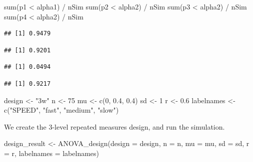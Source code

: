 \documentclass[
]{book}
\newenvironment{Shaded}{\begin{snugshade}}{\end{snugshade}}
\newcommand{\AttributeTok}[1]{\textcolor[rgb]{0.77,0.63,0.00}{#1}}
\newcommand{\DecValTok}[1]{\textcolor[rgb]{0.00,0.00,0.81}{#1}}
\newcommand{\FloatTok}[1]{\textcolor[rgb]{0.00,0.00,0.81}{#1}}
\newcommand{\FunctionTok}[1]{\textcolor[rgb]{0.00,0.00,0.00}{#1}}
\newcommand{\NormalTok}[1]{#1}
\newcommand{\OtherTok}[1]{\textcolor[rgb]{0.56,0.35,0.01}{#1}}
\newcommand{\SpecialCharTok}[1]{\textcolor[rgb]{0.00,0.00,0.00}{#1}}
\newcommand{\StringTok}[1]{\textcolor[rgb]{0.31,0.60,0.02}{#1}}
\begin{document}
\begin{Shaded}
\begin{Highlighting}[]
\FunctionTok{sum}\NormalTok{(p1 }\SpecialCharTok{\textless{}}\NormalTok{ alpha1) }\SpecialCharTok{/}\NormalTok{ nSim}
\FunctionTok{sum}\NormalTok{(p2 }\SpecialCharTok{\textless{}}\NormalTok{ alpha2) }\SpecialCharTok{/}\NormalTok{ nSim}
\FunctionTok{sum}\NormalTok{(p3 }\SpecialCharTok{\textless{}}\NormalTok{ alpha2) }\SpecialCharTok{/}\NormalTok{ nSim}
\FunctionTok{sum}\NormalTok{(p4 }\SpecialCharTok{\textless{}}\NormalTok{ alpha2) }\SpecialCharTok{/}\NormalTok{ nSim}
\end{Highlighting}
\end{Shaded}

\begin{verbatim}
## [1] 0.9479
\end{verbatim}

\begin{verbatim}
## [1] 0.9201
\end{verbatim}

\begin{verbatim}
## [1] 0.0494
\end{verbatim}

\begin{verbatim}
## [1] 0.9217
\end{verbatim}

\begin{Shaded}
\begin{Highlighting}[]
\NormalTok{design }\OtherTok{\textless{}{-}} \StringTok{"3w"}
\NormalTok{n }\OtherTok{\textless{}{-}} \DecValTok{75}
\NormalTok{mu }\OtherTok{\textless{}{-}} \FunctionTok{c}\NormalTok{(}\DecValTok{0}\NormalTok{, }\FloatTok{0.4}\NormalTok{, }\FloatTok{0.4}\NormalTok{)}
\NormalTok{sd }\OtherTok{\textless{}{-}} \DecValTok{1}
\NormalTok{r }\OtherTok{\textless{}{-}} \FloatTok{0.6}
\NormalTok{labelnames }\OtherTok{\textless{}{-}} \FunctionTok{c}\NormalTok{(}\StringTok{"SPEED"}\NormalTok{, }
                \StringTok{"fast"}\NormalTok{, }\StringTok{"medium"}\NormalTok{, }\StringTok{"slow"}\NormalTok{)}
\end{Highlighting}
\end{Shaded}

We create the 3-level repeated measures design, and run the simulation.

\begin{Shaded}
\begin{Highlighting}[]
\NormalTok{design\_result }\OtherTok{\textless{}{-}} \FunctionTok{ANOVA\_design}\NormalTok{(}\AttributeTok{design =}\NormalTok{ design,}
                   \AttributeTok{n =}\NormalTok{ n, }
                   \AttributeTok{mu =}\NormalTok{ mu, }
                   \AttributeTok{sd =}\NormalTok{ sd, }
                   \AttributeTok{r =}\NormalTok{ r, }
                   \AttributeTok{labelnames =}\NormalTok{ labelnames)}
\end{Highlighting}
\end{Shaded}
\end{document}
